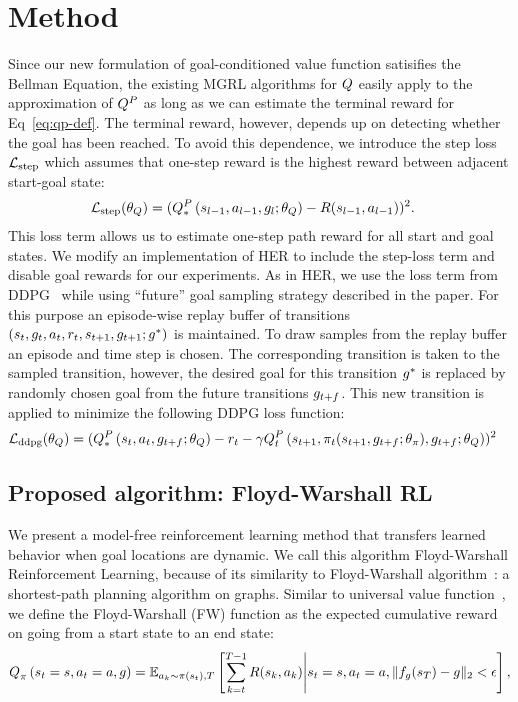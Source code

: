 \section{Method}
Since our new formulation of goal-conditioned value function satisifies the
Bellman Equation, the existing MGRL algorithms for $\fw$ easily apply to the
approximation of $\fw^P$ as long as we can estimate the terminal reward for
Eq~\eqref{eq:qp-def}. The terminal reward, however, depends up on detecting
whether the goal has been reached. To avoid this dependence, we introduce the
step loss $\LossStep$ which assumes that one-step reward is the highest reward between
adjacent start-goal state:
%
\begin{align}
      \LossStep(\param_\fw) &= (\fwargs{\state_{l-1}}{\act_{l-1}}{\goal_{l};\param_\fw}{*}{P} - \Rew(\state_{l-1}, \act_{l-1}))^2.
\end{align}
%
This loss term allows us to estimate one-step path reward for all start and goal
states.
We modify an implementation of HER to include the step-loss term and disable goal
rewards for our experiments.
As in HER, we use the loss term from DDPG~\cite{lillicrap2015continuous} while
using ``future'' goal sampling strategy described in the paper.
For this purpose an episode-wise replay buffer of transitions $(\state_t,
\goal_t, \act_t, \rew_t, \state_{t+1}, \goal_{t+1}; \goal^*)$ is maintained. To draw samples
from the replay buffer an episode and time step is chosen. The corresponding
transition is taken to the sampled transition, however, the desired goal for
this transition $\goal^*$ is replaced by randomly chosen goal from the future
transitions $\goal_{t+f}$. This new transition is applied to minimize the
following DDPG loss function:
%
\begin{align}
  \LossDDPG(\param_\fw) &= (\fwargs{\state_{t}}{\act_{t}}{\goal_{t+f}; \param_\fw}{*}{P} -
      \rew_t - \discount\fwargs{\state_{t+1}}{\policy_t(\state_{t+1}, \goal_{t+f};\param_\policy)}{\goal_{t+f};\param_\fw}{t}{P})^2
\end{align}
%

\subsection{Proposed algorithm: Floyd-Warshall RL}

We present a model-free reinforcement learning method that transfers
learned behavior when goal locations are dynamic. We call this algorithm
Floyd-Warshall Reinforcement Learning, because of its similarity to
Floyd-Warshall algorithm~\cite{floydwarshall1962}:
a shortest-path planning algorithm on graphs. Similar
to universal value function~\cite{schaul2015universal}, we define the Floyd-Warshall
(FW) function as the expected cumulative reward on going from a start
state to an end state:
%
\begin{align}
\fwargs{\state_t = \state}{\act_t = \act}{\goal}{\policy}{} =
\E_{\act_k \sim \policy(\state_t),T}\left[ \sum_{k=t}^{T-1} \Rew(\state_k, \act_k) \middle\vert \state_t = \state, \act_t = \act, \|f_\goal(\state_T) - \goal\|_2 < \epsilon \right] ,
\end{align}%
%

